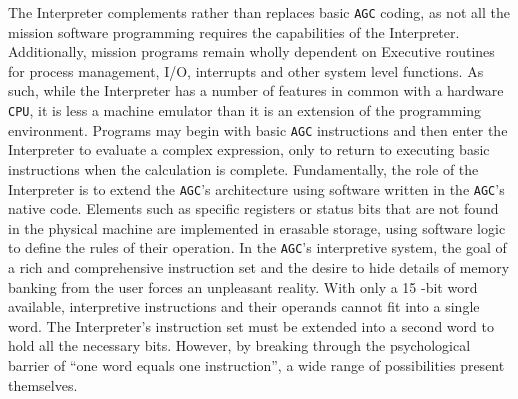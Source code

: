 \documentclass[refcap, oxford]{ahsan}
\begin{document}
The Interpreter complements rather than replaces basic \texttt{AGC} coding, as not all the mission software programming requires the capabilities of the Interpreter. Additionally, mission programs remain wholly dependent on Executive routines for process management, I/O, interrupts and other system level functions. As such, while the Interpreter has a number of features in common with a hardware \texttt{CPU}, it is less a machine emulator than it is an extension of the programming environment. Programs may begin with basic \texttt{AGC} instructions and then enter the Interpreter to evaluate a complex expression, only to return to executing basic instructions when the calculation is complete. Fundamentally, the role of the Interpreter is to extend the \texttt{AGC}'s architecture using software written in the \texttt{AGC}'s native code. Elements such as specific registers or status bits that are not found in the physical machine are implemented in erasable storage, using software logic to define the rules of their operation. In the \texttt{AGC}'s interpretive system, the goal of a rich and comprehensive instruction set and the desire to hide details of memory banking from the user forces an unpleasant reality. With only a 15 -bit word available, interpretive instructions and their operands cannot fit into a single word. The Interpreter's instruction set must be extended into a second word to hold all the necessary bits. However, by breaking through the psychological barrier of ``one word equals one instruction'', a wide range of possibilities present themselves.
\end{document}
